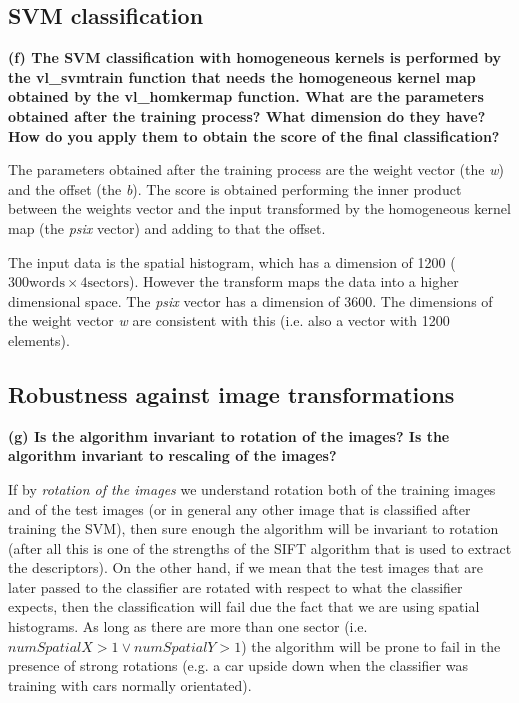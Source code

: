 \subsection{SVM classification}

{\bfseries (f) The SVM classification with homogeneous kernels is performed by the vl\_svmtrain function that needs the homogeneous kernel map obtained by the vl\_homkermap function. What are the parameters obtained after the training process? What dimension do they have? How do you apply them to obtain the score of the final classification?}

The parameters obtained after the training process are the weight vector (the \emph{w}) and the offset (the \emph{b}). The score is obtained performing the inner product between the weights vector and the input transformed by the homogeneous kernel map (the \emph{psix} vector) and adding to that the offset.

The input data is the spatial histogram, which has a dimension of 1200 ($ 300 \mathrm{words} \times 4 \mathrm{sectors} $). However the transform maps the data into a higher dimensional space. The \emph{psix} vector has a dimension of 3600. The dimensions of the weight vector \emph{w} are consistent with this (i.e. also a vector with 1200 elements).

\subsection{Robustness against image transformations}

{\bfseries (g) Is the algorithm invariant to rotation of the images? Is the algorithm invariant to rescaling of the images?}

If by \emph{rotation of the images} we understand rotation both of the training images and of the test images (or in general any other image that is classified after training the SVM), then sure enough the algorithm will be invariant to rotation (after all this is one of the strengths of the SIFT algorithm that is used to extract the descriptors). On the other hand, if we mean that the test images that are later passed to the classifier are rotated with respect to what the classifier expects, then the classification will fail due the fact that we are using spatial histograms. As long as there are more than one sector (i.e. $ numSpatialX > 1 \lor numSpatialY > 1 $) the algorithm will be prone to fail in the presence of strong rotations (e.g. a car upside down when the classifier was training with cars normally orientated).

